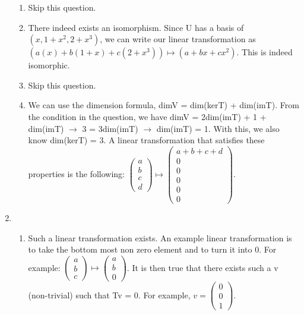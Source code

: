 \documentclass{article}
\begin{document}
\begin{enumerate}
\begin{enumerate}
\item Skip this question.

\item There indeed exists an isomorphism. Since U has a basis of $(x,1+x^2,2+x^3)$, we can write our linear transformation as $(a(x) + b(1+x) + c(2+x^3)) \mapsto (a + bx + cx^2)$. This is indeed isomorphic.

\item Skip this question.

\item We can use the dimension formula, dimV = dim(kerT) + dim(imT). From the condition in the question, we have dimV = 2dim(imT) + 1 + dim(imT) $\rightarrow$ 3 = 3dim(imT) $\rightarrow$ dim(imT) = 1. With this, we also know dim(kerT) = 3. A linear transformation that satisfies these properties is the following: $\left(\begin{array}{c} a \\ b \\ c \\ d \end{array}\right) \mapsto \left(\begin{array}{c} a + b + c + d \\ 0 \\ 0 \\ 0 \\ 0 \\ 0 \end{array}\right)$.

\end{enumerate}

\item

\begin{enumerate}

\item Such a linear transformation exists. An example linear transformation is to take the bottom most non zero element and to turn it into 0. For example: $\left(\begin{array}{c} a \\ b \\ c \end{array}\right) \mapsto \left(\begin{array}{c} a \\ b \\ 0 \end{array}\right)$. It is then true that there exists such a v (non-trivial) such that Tv = 0. For example, $v = \left(\begin{array}{c} 0 \\ 0 \\ 1 \end{array}\right)$.


\end{enumerate}
\end{enumerate}
\end{document}
